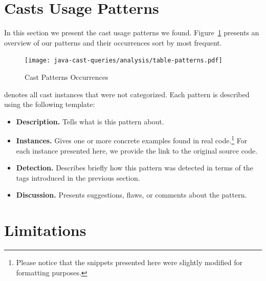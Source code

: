 \section{Casts Usage Patterns}

\label{sec:patterns}

In this section we present the cast usage patterns we found.
Figure~\ref{fig:patterns} presents an overview of our patterns and their occurrences sort by most frequent.

\begin{figure}[h]
\centering
\texttt{[image: java-cast-queries/analysis/table-patterns.pdf]}
\caption{Cast Patterns Occurrences} \label{fig:patterns}
\end{figure}

 denotes all cast instances that were not categorized.
Each pattern is described using the following template:

\begin{itemize}
\item \textbf{Description.}
Tells what is this pattern about.
\item \textbf{Instances.}
Gives one or more concrete examples found in real
code.\footnote{Please notice that the snippets presented here were slightly modified for formatting purposes.}
For each instance presented here,
we provide the link to the original source code.
\item \textbf{Detection.}
Describes briefly how this pattern was detected in terms of the tags
introduced in the previous section.
\item \textbf{Discussion.}
Presents suggestions, flaws, or comments about the pattern.
\end{itemize}











\section{Limitations}
